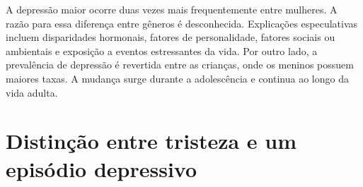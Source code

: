 A depressão maior ocorre duas vezes mais frequentemente entre mulheres. A razão para essa diferença entre gêneros é
desconhecida. Explicações especulativas incluem disparidades hormonais, fatores de personalidade, fatores sociais ou ambientais e exposição a eventos estressantes da vida. Por outro lado, a prevalência de depressão é revertida entre as crianças, onde os meninos possuem maiores taxas. A mudança surge durante a adolescência e continua ao longo da vida adulta. \cite{DSM5}

\section{Distinção entre tristeza e um episódio depressivo}




